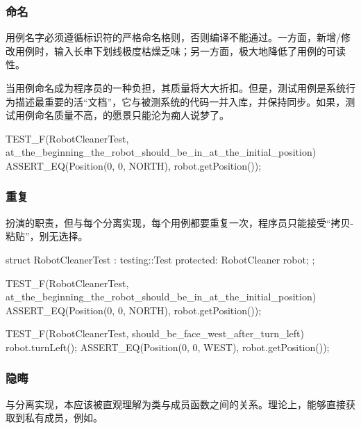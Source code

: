 \begin{content}
\subsubsection{命名}

用例名字必须遵循标识符的严格命名格则，否则编译不能通过。一方面，新增/修改用例时，输入长串下划线极度枯燥乏味；另一方面，极大地降低了用例的可读性。

当用例命名成为程序员的一种负担，其质量将大大折扣。但是，测试用例是系统行为描述最重要的活“文档”，它与被测系统的代码一并入库，并保持同步。如果，测试用例命名质量不高，的愿景只能沦为痴人说梦了。

\begin{leftbar}
 \begin{c++}
TEST_F(RobotCleanerTest, at_the_beginning_the_robot_should_be_in_at_the_initial_position) {
  ASSERT_EQ(Position(0, 0, NORTH), robot.getPosition());
}
 \end{c++}
\end{leftbar}

\subsubsection{重复}

扮演的职责，但与每个分离实现，每个用例都要重复一次，程序员只能接受“拷贝-粘贴”，别无选择。

\begin{leftbar}
 \begin{c++}
struct RobotCleanerTest : testing::Test {
protected:
  RobotCleaner robot;
};
 
TEST_F(RobotCleanerTest, at_the_beginning_the_robot_should_be_in_at_the_initial_position) {
  ASSERT_EQ(Position(0, 0, NORTH), robot.getPosition());
}
 
TEST_F(RobotCleanerTest, should_be_face_west_after_turn_left) {
  robot.turnLeft();
  ASSERT_EQ(Position(0, 0, WEST), robot.getPosition());
}
  \end{c++}
\end{leftbar}

\subsubsection{隐晦}

与分离实现，本应该被直观理解为类与成员函数之间的关系。理论上，能够直接获取到私有成员，例如。


\end{content}
